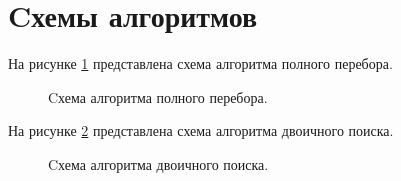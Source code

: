 \documentclass[12pt]{report}
\begin{document}
\section{Cхемы алгоритмов}

На рисунке \ref{fig:Brute} представлена схема алгоритма полного перебора.

\begin{figure}[H]
	\caption{Cхема алгоритма полного перебора.}
	\label{fig:Brute}
\end{figure}

\newpage
На рисунке \ref{fig:Binary} представлена схема алгоритма двоичного поиска.

\begin{figure}[H]
	\caption{Cхема алгоритма двоичного поиска.}
	\label{fig:Binary}
\end{figure}
\end{document}
